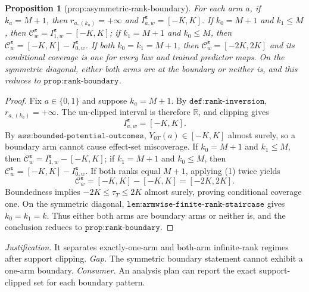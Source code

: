 \documentclass{article}
\newtheorem{proposition}{Proposition}
\begin{document}
\begin{proposition}[prop:asymmetric-rank-boundary]\label{prop:asymmetric-rank-boundary}
For each arm \(a\), if \(k_a=M+1\), then \(r_{a,(k_a)}=+\infty\) and \(I^{\boldsymbol\varepsilon}_{a,w}=[-K,K]\). If \(k_0=M+1\) and \(k_1\le M\), then \(\mathcal C^{\boldsymbol\varepsilon}_w=I^{\boldsymbol\varepsilon}_{1,w}-[-K,K]\); if \(k_1=M+1\) and \(k_0\le M\), then \(\mathcal C^{\boldsymbol\varepsilon}_w=[-K,K]-I^{\boldsymbol\varepsilon}_{0,w}\). If both \(k_0=k_1=M+1\), then \(\mathcal C^{\boldsymbol\varepsilon}_w=[-2K,2K]\) and its conditional coverage is one for every law and trained predictor maps. On the symmetric diagonal, either both arms are at the boundary or neither is, and this reduces to \(\texttt{prop:rank-boundary}\).
\end{proposition}
\begin{proof}
Fix \(a\in\{0,1\}\) and suppose \(k_a=M+1\). By \(\texttt{def:rank-inversion}\), \(r_{a,(k_a)}=+\infty\). The un-clipped interval is therefore \(\mathbb R\), and clipping gives
\[
I^{\boldsymbol\varepsilon}_{a,w}=[-K,K].
\tag{1}
\]
By \(\texttt{ass:bounded-potential-outcomes}\), \(Y_{0T}(a)\in[-K,K]\) almost surely, so a boundary arm cannot cause effect-set miscoverage. If \(k_0=M+1\) and \(k_1\le M\), then \(\mathcal C^{\boldsymbol\varepsilon}_w=I^{\boldsymbol\varepsilon}_{1,w}-[-K,K]\); if \(k_1=M+1\) and \(k_0\le M\), then \(\mathcal C^{\boldsymbol\varepsilon}_w=[-K,K]-I^{\boldsymbol\varepsilon}_{0,w}\). If both ranks equal \(M+1\), applying (1) twice yields
\[
\mathcal C^{\boldsymbol\varepsilon}_w=[-K,K]-[-K,K]=[-2K,2K].
\]
Boundedness implies \(-2K\le\tau_T\le2K\) almost surely, proving conditional coverage one. On the symmetric diagonal, \(\texttt{lem:armwise-finite-rank-staircase}\) gives \(k_0=k_1=k\). Thus either both arms are boundary arms or neither is, and the conclusion reduces to \(\texttt{prop:rank-boundary}\).
\end{proof}
\par\smallskip\noindent \textit{Justification.} It separates exactly-one-arm and both-arm infinite-rank regimes after support clipping. \textit{Gap.} The symmetric boundary statement cannot exhibit a one-arm boundary. \textit{Consumer.} An analysis plan can report the exact support-clipped set for each boundary pattern.
\end{document}
